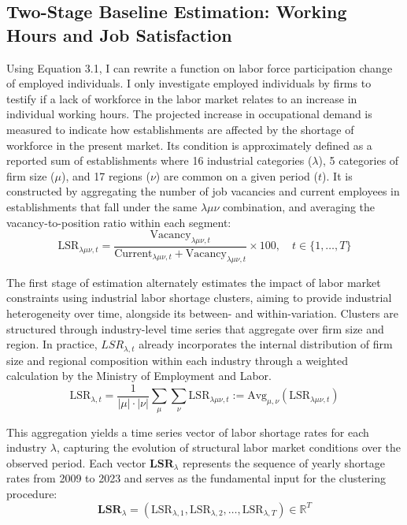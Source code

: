 \documentclass[
  12pt,
]{article}
\begin{document}
\subsection{Two-Stage Baseline Estimation: Working Hours and Job
Satisfaction}\label{two-stage-baseline-estimation-working-hours-and-job-satisfaction}

Using Equation 3.1, I can rewrite a function on labor force
participation change of employed individuals. I only investigate
employed individuals by firms to testify if a lack of workforce in the
labor market relates to an increase in individual working hours. The
projected increase in occupational demand is measured to indicate how
establishments are affected by the shortage of workforce in the present
market. Its condition is approximately defined as a reported sum of
establishments where 16 industrial categories (\(\lambda\)), 5
categories of firm size (\(\mu\)), and 17 regions (\(\nu\)) are common
on a given period (\(t\)). It is constructed by aggregating the number
of job vacancies and current employees in establishments that fall under
the same \(\lambda\mu\nu\) combination, and averaging the
vacancy-to-position ratio within each segment: \[
\text{LSR}_{\lambda\mu\nu,t} =  \frac{\text{Vacancy}_{\lambda\mu\nu,t}}{\text{Current}_{\lambda\mu\nu,t}+\text{Vacancy}_{\lambda\mu\nu,t}}\times 100, \quad t \in \{1, \dots, T\} 
\]

The first stage of estimation alternately estimates the impact of labor
market constraints using industrial labor shortage clusters, aiming to
provide industrial heterogeneity over time, alongside its between- and
within-variation. Clusters are structured through industry-level time
series that aggregate over firm size and region. In practice,
\(LSR_{\lambda,t}\) already incorporates the internal distribution of
firm size and regional composition within each industry through a
weighted calculation by the Ministry of Employment and Labor. \[
\text{LSR}_{\lambda,t} = \frac{1}{|\mu| \cdot |\nu|} \sum_\mu \sum_\nu \text{LSR}_{\lambda\mu\nu,t} := \text{Avg}_{\mu,\nu}\left( \text{LSR}_{\lambda\mu\nu,t} \right)
\]

This aggregation yields a time series vector of labor shortage rates for
each industry \(\lambda\), capturing the evolution of structural labor
market conditions over the observed period. Each vector
\(\mathbf{LSR}_\lambda\) represents the sequence of yearly shortage
rates from 2009 to 2023 and serves as the fundamental input for the
clustering procedure: \[
\mathbf{LSR}_\lambda = \left( \text{LSR}_{\lambda,1}, \text{LSR}_{\lambda,2}, \dots, \text{LSR}_{\lambda,T} \right) \in \mathbb{R}^T
\]
\end{document}
